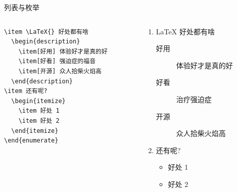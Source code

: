 \begin{frame}[fragile]{列表与枚举}
\begin{columns}
\begin{column}{.6\textwidth}

  \begin{lstlisting}[basicstyle=\ttfamily\small]
\item \LaTeX{} 好处都有啥
  \begin{description}
    \item[好用] 体验好才是真的好
    \item[好看] 强迫症的福音
    \item[开源] 众人拾柴火焰高
  \end{description}
\item 还有呢?
  \begin{itemize}
    \item 好处 1
    \item 好处 2
  \end{itemize}
\end{enumerate}
\end{lstlisting}
\end{column}
\begin{column}{.4\textwidth}
{\small
\begin{enumerate}
\item \LaTeX{} 好处都有啥
  \begin{description}
    \item[好用] 体验好才是真的好
    \item[好看] 治疗强迫症
    \item[开源] 众人拾柴火焰高
  \end{description}
\item 还有呢?
  \begin{itemize}
    \item 好处 1
    \item 好处 2
  \end{itemize}
\end{enumerate}
}
\end{column}
\end{columns}

\end{frame}


